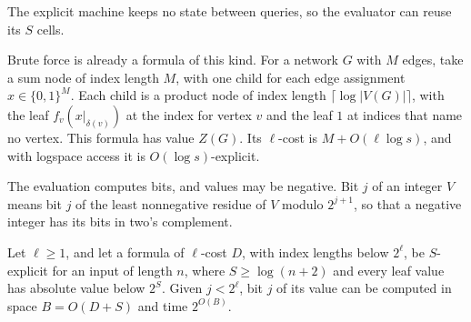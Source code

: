 \documentclass[11pt]{article}
\theoremstyle{definition}
\theoremstyle{definition}
\theoremstyle{remark}
\begin{document}
The explicit machine keeps no state between queries, so the evaluator can reuse its $S$ cells.

Brute force is already a formula of this kind. For a network $G$ with $M$ edges, take a sum node of index length $M$, with one child for each edge assignment $x\in\{0,1\}^M$. Each child is a product node of index length $\lceil\log|V(G)|\rceil$, with the leaf $f_v(x|_{\delta(v)})$ at the index for vertex $v$ and the leaf $1$ at indices that name no vertex. This formula has value $Z(G)$. Its $\ell$-cost is $M+O(\ell\log s)$, and with logspace access it is $O(\log s)$-explicit.

The evaluation computes bits, and values may be negative. Bit $j$ of an integer $V$ means bit $j$ of the least nonnegative residue of $V$ modulo $2^{j+1}$, so that a negative integer has its bits in two's complement.

\begin{proposition}\label{lem:formula}
Let $\ell\ge1$, and let a formula of $\ell$-cost $D$, with index lengths below $2^\ell$, be $S$-explicit for an input of length $n$, where $S\ge\log(n+2)$ and every leaf value has absolute value below $2^S$. Given $j<2^\ell$, bit $j$ of its value can be computed in space $B=O(D+S)$ and time $2^{O(B)}$.
\end{proposition}
\end{document}
